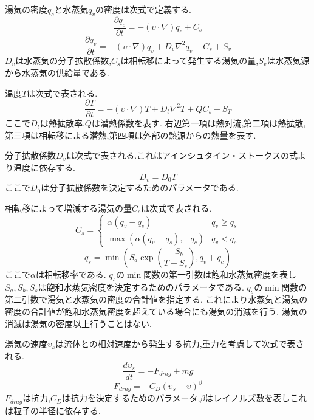 \documentclass[submit,techrep]{ipsj}
\begin{document}
湯気の密度$q_{c}$と水蒸気$q_{v}$の密度は次式で定義する.
\begin{equation}
\label{steam}
\frac{\partial q_{c}}{\partial t} = -(\upsilon \cdot \nabla)q_{c} + C_{s}
\end{equation}
\begin{equation}
\label{vapor}
\frac{\partial q_{v}}{\partial t} = -(\upsilon \cdot \nabla)q_{v} + D_{v}\nabla^2q_{v} - C_{s} + S_{v}
\end{equation}
$D_{v}$は水蒸気の分子拡散係数,$C_{s}$は相転移によって発生する湯気の量,$S_{v}$は水蒸気源から水蒸気の供給量である.

温度$T$は次式で表される.
\begin{equation}
\label{temperature}
\frac{\partial T}{\partial t} = - (\upsilon \cdot \nabla)T + D_{t}\nabla^2T +  QC_{s} + S_{T}
\end{equation}
ここで$D_{t}$は熱拡散率,$Q$は潜熱係数を表す.
右辺第一項は熱対流,第二項は熱拡散,第三項は相転移による潜熱,第四項は外部の熱源からの熱量を表す.

分子拡散係数$D_{v}$は次式で表される.これはアインシュタイン・ストークスの式より温度に依存する.
\begin{equation}
\label{diffusion}
D_{v}=D_{0}T
\end{equation}
ここで$D_{0}$は分子拡散係数を決定するためのパラメータである.

相転移によって増減する湯気の量$C_{s}$は次式で表される.
\begin{equation}
\label{transition} 
C_{s} =
\begin{cases}
 \alpha(q_{v}-q_{s}) & q_{v} \geq q_{s}\\
 \max\left(\alpha(q_{v}-q_{s}),-q_{c}\right) & q_{v} < q_{s}
\end{cases}
\end{equation}
\begin{equation}
\label{saturation}
q_{s} = \min\left(S_{a} \exp\left(\frac{-S_{b}}{T+S_{s}}\right),q_{v}+q_{c}\right)
\end{equation}
ここで$\alpha$は相転移率である.
$q_{s}$の$\min$関数の第一引数は飽和水蒸気密度を表し
$S_{a},S_{b},S_{s}$は飽和水蒸気密度を決定するためのパラメータである.
$q_{s}$の$\min$関数の第二引数で湯気と水蒸気の密度の合計値を指定する.
これにより水蒸気と湯気の密度の合計値が飽和水蒸気密度を超えている場合にも湯気の消滅を行う.
湯気の消滅は湯気の密度以上行うことはない.

湯気の速度$\upsilon_{s}$は流体との相対速度から発生する抗力,重力を考慮して次式で表される.
\begin{equation}
\label{lagurange}
\frac{d\upsilon_{s}}{dt} = - F_{drag} + mg
\end{equation}
\begin{equation}
\label{dragforce}
F_{drag} = - C_{D} (\upsilon_{s} - \upsilon)^\beta
\end{equation}
$F_{drag}$は抗力,$C_{D}$は抗力を決定するためのパラメータ,$\beta$はレイノルズ数を表しこれは粒子の半径に依存する.
\end{document}
